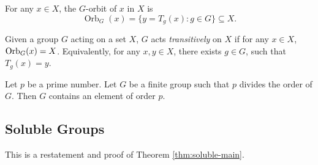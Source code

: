 \begin{definition}
	For any $x \in X$, the $G$-orbit of $x$ in $X$ is
	$$\operatorname{Orb}_G(x) = \{ y = T_g(x) : g \in G \} \subseteq X.$$

	
\end{definition}

\begin{definition} \label{def:transitive-action}
	Given a group $G$ acting on a set $X$, $G$ acts \textit{transitively} on $X$ if for any $x \in X$, $\operatorname{Orb}_G(x) = X$. Equivalently, for any $x, y\in X$, there exists $g \in G$, such that $T_g(x) = y$. 
\end{definition}

\begin{theorem} \label{thm:cauchy}
	Let $p$ be a prime number. Let $G$ be a finite group such that $p$ divides the order of $G$. Then $G$ contains an element of order $p$. 
\end{theorem}

\subsection{Soluble Groups}
This is a restatement and proof of Theorem \ref{thm:soluble-main}.

